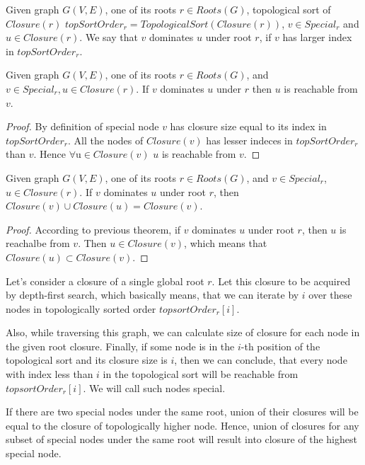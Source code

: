 \documentclass{svproc}
\begin{document}
\begin{definition}
    Given graph $G(V, E)$, one of its roots $r \in Roots(G)$, topological sort of $Closure(r)$ $topSortOrder_r = TopologicalSort(Closure(r))$,
    $v \in Special_r$ and $u \in Closure(r)$. We say that $v$ dominates $u$ under root $r$, if  $v$ has larger index in $topSortOrder_r$.
\end{definition}

\begin{theorem}
    Given graph $G(V,E)$, one of its roots $r \in Roots(G)$, and $v \in Special_r, u \in Closure(r)$.
    If $v$ dominates $u$ under $r$ then $u$ is reachable from $v$.
\end{theorem}
\begin{proof}
    By definition of special node $v$ has closure size equal to its index in $topSortOrder_r$. All the nodes of $Closure(v)$ has lesser indeces 
    in $topSortOrder_r$ than $v$. Hence $\forall $u$ \in Closure(v)$ $u$ is reachable from $v$.
\end{proof}

\begin{theorem}
   Given graph $G(V,E)$, one of its roots $r \in Roots(G)$, and $v \in Special_r$, $u \in Closure(r)$. 
   If $v$ dominates $u$ under root $r$, then $Closure(v) \cup Closure(u) = Closure(v)$.
\end{theorem}
\begin{proof}
    According to previous theorem, if $v$ dominates $u$ under root $r$, then $u$ is reachalbe from $v$. Then $u \in Closure(v)$,
    which means that $Closure(u) \subset Closure(v)$.
\end{proof}

Let's consider a closure of a single global root $r$. Let this closure to be acquired by depth-first search, which basically means, that
we can iterate by $i$ over these nodes in topologically sorted order $topsortOrder_r[i]$. 

Also, while traversing this graph, we can calculate size of closure for each node
in the given root closure. Finally, if some node is in the $i$-th position of the topological sort and its closure size is $i$, then we can 
conclude, that every node with index less than $i$ in the topological sort will be reachable from $topsortOrder_r[i]$. We will call such nodes special.

If there are two special nodes under the same root, union of their closures will be equal to the closure of topologically higher node.
Hence, union of closures for any subset of special nodes under the same root will result into closure of the highest special node.
\end{document}
